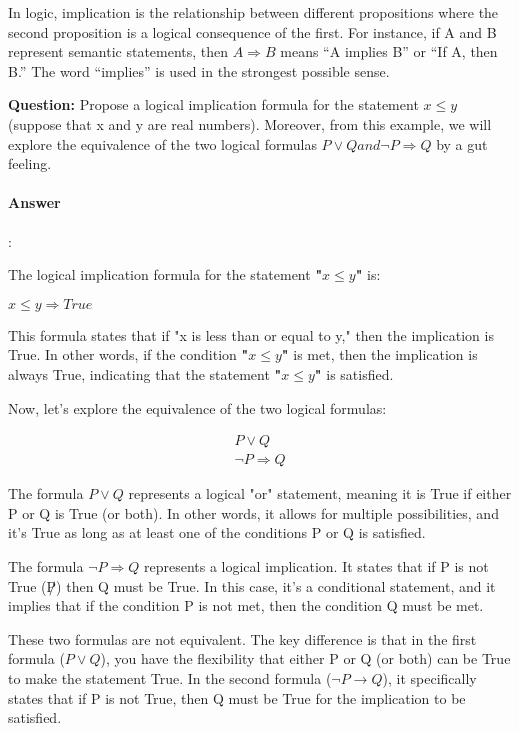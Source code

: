 \documentclass{article}
\begin{document}
In logic, implication is the relationship between different propositions where the second proposition is a logical consequence of the first. For instance, if A and B represent semantic statements, then $A \Longrightarrow B$ means “A implies B” or “If A, then B.” The word “implies” is used in the strongest possible sense.

\begin{tcolorbox}
  \textbf{Question:} Propose a logical implication formula for the statement $x \leq y$ (suppose that x and y are real numbers). Moreover, from this example, we will explore the equivalence of the two logical formulas $P \lor Q and \lnot P \Longrightarrow Q$ by a gut feeling.
\end{tcolorbox}

\paragraph{Answer}:

The logical implication formula for the statement \textbf{"$x \leq y$"} is:

$x \leq y \Rightarrow True$

This formula states that if "x is less than or equal to y," then the implication is True. In other words, if the condition  \textbf{"$x \leq y$"} is met, then the implication is always True, indicating that the statement \textbf{"$x \leq y$"} is satisfied.

Now, let's explore the equivalence of the two logical formulas:

\begin{equation*}
  \begin{aligned}
    P \lor Q \\
    \lnot P \Rightarrow Q
  \end{aligned}  
\end{equation*}

The formula $P \lor Q$ represents a logical "or" statement, meaning it is True if either P or Q is True (or both). In other words, it allows for multiple possibilities, and it's True as long as at least one of the conditions P or Q is satisfied.

The formula $\lnot P \Rightarrow Q$ represents a logical implication. It states that if P is not True ($\not P$) then Q must be True. In this case, it's a conditional statement, and it implies that if the condition P is not met, then the condition Q must be met.

These two formulas are not equivalent. The key difference is that in the first formula ($P \lor Q$), you have the flexibility that either P or Q (or both) can be True to make the statement True. In the second formula ($\lnot P \longrightarrow Q$), it specifically states that if P is not True, then Q must be True for the implication to be satisfied.
\end{document}
